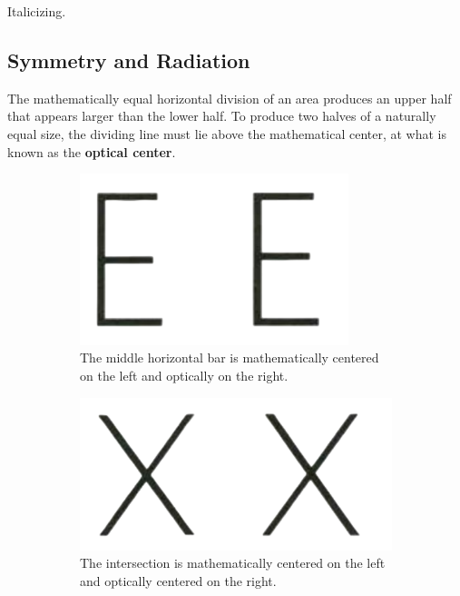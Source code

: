   Italicizing. 

\subsection{Symmetry and Radiation} 

  \begin{theorem}[Symmetry]
    The mathematically equal horizontal division of an area produces an upper half that appears larger than the lower half. To produce two halves of a naturally equal size, the dividing line must lie above the mathematical center, at what is known as the \textbf{optical center}.  

    \begin{figure}[H]
      \centering
      \begin{subfigure}[b]{0.43\textwidth}
        \centering
        \includegraphics[width=0.86\textwidth]{img/e.png}
        \caption{The middle horizontal bar is mathematically centered on the left and optically on the right. }
        \label{fig:e}
      \end{subfigure}
      \hfill 
      \begin{subfigure}[b]{0.48\textwidth}
        \centering
        \includegraphics[width=\textwidth]{img/x.png}
        \caption{The intersection is mathematically centered on the left and optically centered on the right. }
        \label{fig:x}
      \end{subfigure}
      \caption{}
      \label{fig:symmetry}
    \end{figure}
  \end{theorem} 

